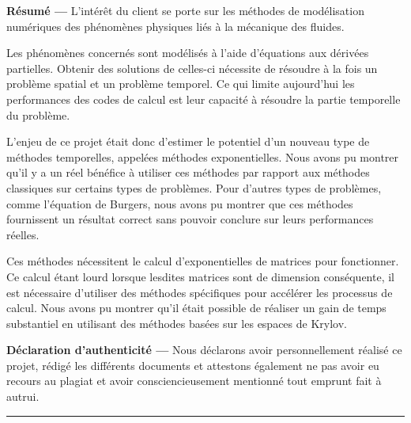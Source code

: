 \textbf{Résumé ---} L'intérêt du client se porte sur les méthodes de modélisation numériques des phénomènes physiques liés à la mécanique des fluides.

Les phénomènes concernés sont modélisés à l'aide d'équations aux dérivées partielles. Obtenir des solutions de celles-ci nécessite de résoudre à la fois un problème spatial et un problème temporel. Ce qui limite aujourd'hui les performances des codes de calcul est leur capacité à résoudre la partie temporelle du problème.

L'enjeu de ce projet était donc d'estimer le potentiel d'un nouveau type de méthodes temporelles, appelées méthodes exponentielles. Nous avons pu montrer qu'il y a un réel bénéfice à utiliser ces méthodes par rapport aux méthodes classiques sur certains types de problèmes. Pour d'autres types de problèmes, comme l'équation de Burgers, nous avons pu montrer que ces méthodes fournissent un résultat correct sans pouvoir conclure sur leurs performances réelles.

Ces méthodes nécessitent le calcul d'exponentielles de matrices pour fonctionner. Ce calcul étant lourd lorsque lesdites matrices sont de dimension conséquente, il est nécessaire d'utiliser des méthodes spécifiques pour accélérer les processus de calcul. Nous avons pu montrer qu'il était possible de réaliser un gain de temps substantiel en utilisant des méthodes basées sur les espaces de Krylov.

\textbf{Déclaration d'authenticité ---} Nous déclarons avoir personnellement réalisé ce projet, rédigé les différents documents et attestons également ne pas avoir eu recours au plagiat et avoir consciencieusement mentionné tout emprunt fait à autrui.


\noindent\rule[2pt]{\textwidth}{0.5pt}